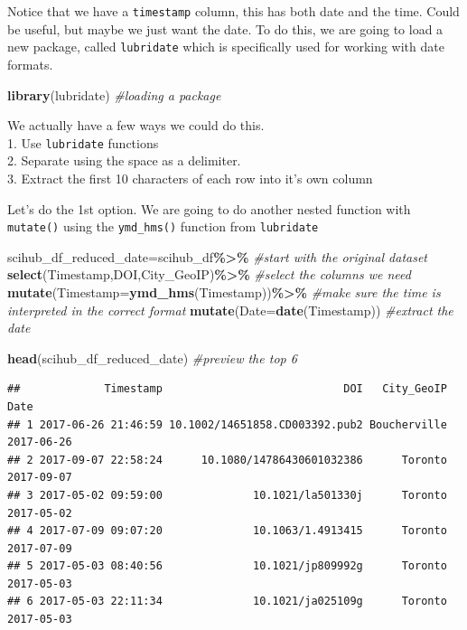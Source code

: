 \documentclass[
]{article}
\newenvironment{Shaded}{\begin{snugshade}}{\end{snugshade}}
\newcommand{\AttributeTok}[1]{\textcolor[rgb]{0.13,0.29,0.53}{#1}}
\newcommand{\CommentTok}[1]{\textcolor[rgb]{0.56,0.35,0.01}{\textit{#1}}}
\newcommand{\FunctionTok}[1]{\textcolor[rgb]{0.13,0.29,0.53}{\textbf{#1}}}
\newcommand{\NormalTok}[1]{#1}
\newcommand{\OtherTok}[1]{\textcolor[rgb]{0.56,0.35,0.01}{#1}}
\newcommand{\SpecialCharTok}[1]{\textcolor[rgb]{0.81,0.36,0.00}{\textbf{#1}}}
\begin{document}
Notice that we have a \texttt{timestamp} column, this has both date and
the time. Could be useful, but maybe we just want the date. To do this,
we are going to load a new package, called \texttt{lubridate} which is
specifically used for working with date formats.

\begin{Shaded}
\begin{Highlighting}[]
\FunctionTok{library}\NormalTok{(lubridate) }\CommentTok{\#loading a package }
\end{Highlighting}
\end{Shaded}

We actually have a few ways we could do this.\\
1. Use \texttt{lubridate} functions\\
2. Separate using the space as a delimiter.\\
3. Extract the first 10 characters of each row into it's own column

Let's do the 1st option. We are going to do another nested function with
\texttt{mutate()} using the \texttt{ymd\_hms()} function from
\texttt{lubridate}

\begin{Shaded}
\begin{Highlighting}[]
\NormalTok{scihub\_df\_reduced\_date}\OtherTok{=}\NormalTok{scihub\_df}\SpecialCharTok{\%\textgreater{}\%} \CommentTok{\#start with the original dataset}
  \FunctionTok{select}\NormalTok{(Timestamp,DOI,City\_GeoIP)}\SpecialCharTok{\%\textgreater{}\%} \CommentTok{\#select the columns we need }
  \FunctionTok{mutate}\NormalTok{(}\AttributeTok{Timestamp=}\FunctionTok{ymd\_hms}\NormalTok{(Timestamp))}\SpecialCharTok{\%\textgreater{}\%} \CommentTok{\#make sure the time is interpreted in the correct format }
  \FunctionTok{mutate}\NormalTok{(}\AttributeTok{Date=}\FunctionTok{date}\NormalTok{(Timestamp)) }\CommentTok{\#extract the date }

\FunctionTok{head}\NormalTok{(scihub\_df\_reduced\_date) }\CommentTok{\#preview the top 6 }
\end{Highlighting}
\end{Shaded}

\begin{verbatim}
##             Timestamp                            DOI   City_GeoIP       Date
## 1 2017-06-26 21:46:59 10.1002/14651858.CD003392.pub2 Boucherville 2017-06-26
## 2 2017-09-07 22:58:24      10.1080/14786430601032386      Toronto 2017-09-07
## 3 2017-05-02 09:59:00              10.1021/la501330j      Toronto 2017-05-02
## 4 2017-07-09 09:07:20              10.1063/1.4913415      Toronto 2017-07-09
## 5 2017-05-03 08:40:56              10.1021/jp809992g      Toronto 2017-05-03
## 6 2017-05-03 22:11:34              10.1021/ja025109g      Toronto 2017-05-03
\end{verbatim}
\end{document}
